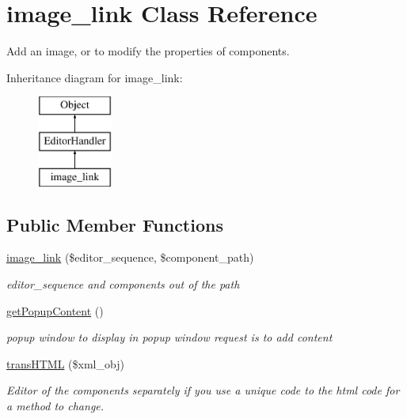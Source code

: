\hypertarget{classimage__link}{\section{image\-\_\-link Class Reference}
\label{classimage__link}
}


Add an image, or to modify the properties of components.  


Inheritance diagram for image\-\_\-link\-:\begin{figure}[H]
\begin{center}
\leavevmode
\includegraphics[height=3.000000cm]{classimage__link}
\end{center}
\end{figure}
\subsection*{Public Member Functions}
\begin{DoxyCompactItemize}
\item 
\hyperlink{classimage__link_a572a8311c1aaa3ddfbe3c1d027822fab}{image\-\_\-link} (\$editor\-\_\-sequence, \$component\-\_\-path)
\begin{DoxyCompactList}\small\item\em editor\-\_\-sequence and components out of the path \end{DoxyCompactList}\item 
\hyperlink{classimage__link_a394ef807a2b750c5b3f0041eb7ab4aaf}{get\-Popup\-Content} ()
\begin{DoxyCompactList}\small\item\em popup window to display in popup window request is to add content \end{DoxyCompactList}\item 
\hyperlink{classimage__link_ac26727c59ca0972802129f4a7b1060cb}{trans\-H\-T\-M\-L} (\$xml\-\_\-obj)
\begin{DoxyCompactList}\small\item\em Editor of the components separately if you use a unique code to the html code for a method to change. \end{DoxyCompactList}\end{DoxyCompactItemize}
